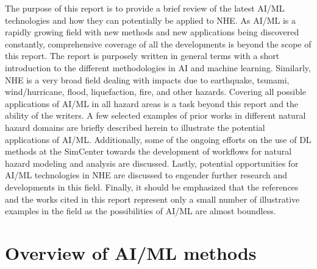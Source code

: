The purpose of this report is to provide a brief review of the latest AI/ML technologies and how they can potentially be applied to NHE. As AI/ML is a rapidly growing field with new methods and new applications being discovered constantly, comprehensive coverage of all the developments is beyond the scope of this report. The report is purposely written in general terms with a short introduction to the different methodologies in AI and machine learning. Similarly, NHE is a very broad field dealing with impacts due to earthquake, tsunami, wind/hurricane, flood, liquefaction, fire, and other hazards. Covering all possible applications of AI/ML in all hazard areas is a task beyond this report and the ability of the writers. A few selected examples of prior works in different natural hazard domains are briefly described herein to illustrate the potential applications of AI/ML. Additionally, some of the ongoing efforts on the use of DL methods at the SimCenter towards the development of workflows for natural hazard modeling and analysis are discussed. Lastly, potential opportunities for AI/ML technologies in NHE are discussed to engender further research and developments in this field. Finally, it should be emphasized that the references and the works cited in this report represent only a small number of illustrative examples in the field as the possibilities of AI/ML are almost boundless. 

\section{Overview of AI/ML methods}
\label{sec:ai_methods}

